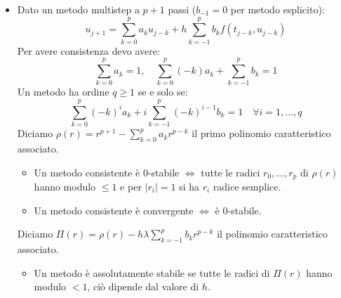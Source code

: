 \documentclass[a4paper,10pt]{article}
\theoremstyle{definition}
\theoremstyle{indentdefinition}
\theoremstyle{indenttheorem}
\theoremstyle{myremark}
\theoremstyle{indentgeneral}
\theoremstyle{plain}
\theoremstyle{plain}
\begin{document}
\begin{itemize}
    \item Dato un metodo multistep a $p+1$ passi ($b_{-1} = 0$ per metodo esplicito):
    \[
    u_{j+1} = \sum_{k=0}^p a_k u_{j-k} + h \sum_{k=-1}^p b_k f(t_{j-k},u_{j-k})
    \]
    Per avere consistenza devo avere:
    \[
    \sum_{k=0}^p a_k = 1, \quad \sum_{k=0}^p (-k)a_k + \sum_{k=-1}^pb_k = 1
    \]
    Un metodo ha ordine $q\ge1$ se e solo se:
    \[
    \sum_{k=0}^p (-k)^ia_k + i\sum_{k=-1}^p (-k)^{i-1}b_k = 1 \quad \forall i=1,\dots,q
    \]
    Diciamo $\rho(r) = r^{p+1} - \sum_{k=0}^pa_kr^{p-k}$ il primo polinomio caratteristico associato.
    \begin{itemize}
        \item  Un metodo consistente è 0-stabile $\iff$ tutte le radici $r_0,\dots,r_p$ di $\rho(r)$ hanno modulo $\le 1$ e per $|r_i| = 1$ si ha $r_i$ radice semplice. 
        \item Un metodo consistente è convergente $\iff$ è 0-stabile.
    
    \end{itemize}
    Diciamo $\Pi(r) = \rho(r) - h\lambda \sum_{k=-1}^p b_kr^{p-k}$ il polinomio caratteristico associato. 
    \begin{itemize}
        \item Un metodo è assolutamente stabile se tutte le radici di $\Pi(r)$ hanno modulo $<1$, ciò dipende dal valore di $h$.
    \end{itemize}
    
   
\end{itemize}
\end{document}
